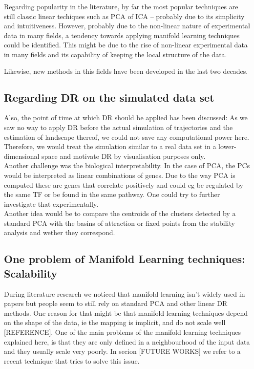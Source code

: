 \documentclass[journal, a4paper]{IEEEtran}
\begin{document}
Regarding popularity in the literature, %
by far the most popular techniques are still classic linear techiques such as PCA of ICA -- probably due to its simplicity and intuitiveness. However, probably due to the non-linear nature of experimental data in many fields, a  tendency towards applying manifold learning techniques could be identified. This might be due to the rise of non-linear experimental data in many fields and its capability of keeping the local structure of the data.

Likewise, new methods in this fields have been developed in the last two decades.

\subsection{Regarding DR on the simulated data set}

Also, the point of time at which DR should be applied has been discussed: As we saw no way to apply DR before the actual simulation of trajectories and the estimation of landscape thereof, we could not save any computational power here. Therefore, we would treat the simulation similar to a real data set in a lower-dimensional space and motivate DR by visualisation purposes only.\\

Another challenge was the biological interpretability. In the case of PCA, the PCs would be interpreted as linear combinations of genes. Due to the way PCA is computed these are genes that correlate positively and could eg be regulated by the same TF or be found in the same pathway. 
One could try to further investigate that experimentally. \\
Another idea would be to compare the centroids of the clusters detected by a standard PCA with the basins of attraction or fixed points from the stability analysis and wether they correspond.

\subsection{One problem of Manifold Learning techniques: Scalability}
During literature research we noticed that manifold learning isn’t widely used in papers but people seem to still rely on standard PCA and other linear DR methods. 
One reason for that might be that manifold learning techniques depend on the shape of the data, ie the mapping is implicit, and do not scale well [REFERENCE]. 
One of the main problems of the manifold learning techniques explained here, is that they are only defined in a neighbourhood of the input data and they usually scale very poorly. In secion [FUTURE WORKS] we refer to a recent technique that tries to solve this issue.
\end{document}
